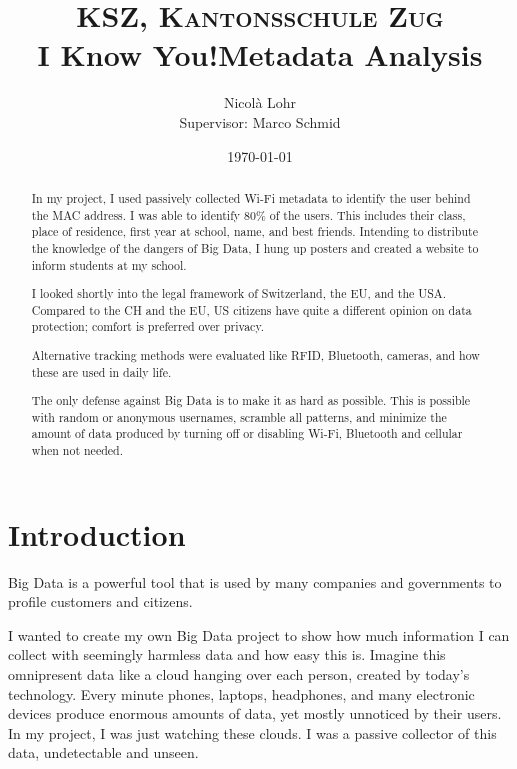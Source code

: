 \documentclass[paper=a4, fontsize=11pt]{article}
\title{\normalfont \normalsize \textsc{KSZ, Kantonsschule Zug} \\ [25pt]
\huge I Know You!\linebreak\linebreak \large Metadata Analysis\\
}
\author{Nicolà Lohr\\[0.5cm]{\small Supervisor: Marco Schmid}}
\date{\normalsize\today}
\begin{document}
\clearpage
\thispagestyle{empty}
\newpage
\linespread{1}
\tableofcontents
\linespread{1.5}
\newpage
\begin{abstract}
In my project, I used passively collected Wi-Fi metadata to identify the user behind the MAC address. I was able to identify 80\% of the users. This includes their class, place of residence, first year at school, name, and best friends.
Intending to distribute the knowledge of the dangers of Big Data, I hung up posters and created a website to inform students at my school.

I looked shortly into the legal framework of Switzerland, the EU, and the USA. Compared to the CH and the EU, US citizens have quite a different opinion on data protection; comfort is preferred over privacy.

Alternative tracking methods were evaluated like RFID, Bluetooth, cameras, and how these are used in daily life.

The only defense against Big Data is to make it as hard as possible. This is possible with random or anonymous usernames, scramble all patterns, and minimize the amount of data produced by turning off or disabling Wi-Fi, Bluetooth and cellular when not needed.
\end{abstract}

\section{Introduction}
Big Data is a powerful tool that is used by many companies and governments to profile customers and citizens.

I wanted to create my own Big Data project to show how much information I can collect with seemingly harmless data and how easy this is. Imagine this omnipresent data like a cloud hanging over each person, created by today's technology. Every minute phones, laptops, headphones, and many electronic devices produce enormous amounts of data, yet mostly unnoticed by their users. In my project, I was just watching these clouds. I was a passive collector of this data, undetectable and unseen.
\end{document}
